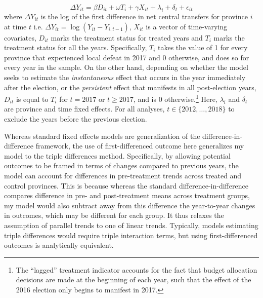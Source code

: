 \documentclass[12pt]{article}
\newcommand{\1}{\mathbbm{1}}
\begin{document}
\begin{equation}
\Delta Y_{it} = \beta D_{it} + \omega T_{i} + \gamma X_{it} + \lambda_i + \delta_t + \epsilon_{it} \label{eq:FE}
\end{equation}
where $\Delta Y_{it}$ is the log of the first difference in net central transfers for province $i$ at time $t$ i.e. $\Delta Y_{it} = \log(Y_{it} - Y_{i, t-1})$, $X_{it}$ is a vector of time-varying covariates, $D_{it}$ marks the treatment status for treated years and $T_{i}$ marks the treatment status for all the years. Specifically, $T_{i}$ takes the value of 1 for every province that experienced local defeat in 2017 and 0 otherwise, and does so for every year in the sample. On the other hand, depending on whether the model seeks to estimate the \textit{instantaneous} effect that occurs in the year immediately after the election, or the \textit{persistent} effect that manifests in all post-election years, $D_{it}$ is equal to $T_{i}$ for $t=2017$ or $t\geq2017$, and is  $0$ otherwise.\footnote{The ``lagged'' treatment indicator accounts for the fact that budget allocation decisions are made at the beginning of each year, such that the effect of the 2016 election only begins to manifest in 2017.} Here, $\lambda_i$ and $\delta_t$ are province and time fixed effects. For all analyses, $t \in \{2012, \ldots, 2018\}$ to exclude the years before the previous election.

Whereas standard fixed effects models are generalization of the difference-in-difference framework, the use of first-differenced outcome here generalizes my model to the triple differences method. Specifically, by allowing potential outcomes to be framed in terms of changes compared to previous years, the model can account for differences in pre-treatment trends across treated and control provinces. This is because whereas the standard difference-in-difference compares difference in pre- and post-treatment means across treatment groups, my model would also subtract away from this difference the year-to-year changes in outcomes, which may be different for each group. It thus relaxes the assumption of parallel trends to one of linear trends. Typically, models estimating triple differences would require triple interaction terms, but using first-differenced outcomes is analytically equivalent. 
\end{document}
